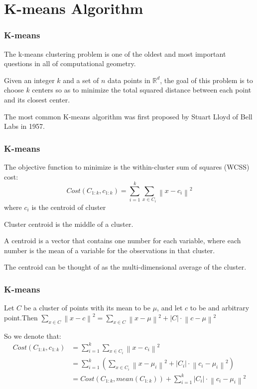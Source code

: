 \documentclass[9pt]{beamer}
\newcommand{\ccp}[1]{{\color{purple}#1}}
\begin{document}
\section{K-means Algorithm}
\begin{frame}
	\frametitle{K-means}
	The \ccp{k-means clustering} problem is one of the oldest and most important questions in all of computational geometry.
	\par Given an integer $k$ and a set of $n$ data points in $\mathbb{R}^{d}$, the goal of this problem is to choose \ccp{$k$ centers} so as to \ccp{minimize the total squared distance between each point and its closest center}.
	\par The most common K-means algorithm was first proposed by \ccp{Stuart Lloyd} of Bell Labs in 1957.

\end{frame}
\begin{frame}
	\frametitle{K-means}
	The objective function to minimize is the \ccp{within-cluster sum of squares} (WCSS) cost:
	$$Cost(C_{1:k}, c_{1:k}) = \sum_{i=1}^{k} \sum_{x \in C_i } {\left\lVert x - c _i \right\rVert }^2  $$
	where $c_i$ is the \ccp{centroid} of cluster
	\begin{definition}
		\ccp{Cluster centroid} is the \ccp{middle} of a cluster.
		\par A centroid is a vector that contains one number for each variable, where each number is the mean of a variable for the observations in that cluster.
		\par The centroid can be thought of as the multi-dimensional average of the cluster.
	\end{definition}
\end{frame}
\begin{frame}
	\frametitle{K-means}
	\begin{lemma}
		Let $C$ be a cluster of points with its mean to be $\mu$, and let $c$ to be and arbitrary point.Then $\sum_{x \in C}{\left\lVert x - c\right\rVert}^2 = \sum_{x \in C}{\left\lVert x - \mu\right\rVert}^2 + \left\lvert C \right\rvert \cdot {\left\lVert c - \mu\right\rVert}^2 $
	\end{lemma}
	So we denote that:
	\begin{equation*}
		\begin{split}
			Cost(C_{1:k}, c_{1:k}) & = \sum_{i=1}^{k} \sum_{x \in C_i } {\left\lVert x - c _i \right\rVert }^2 \\
			& = \sum_{i=1}^{k} (\sum_{x \in C_i} {\left\lVert x - \mu_i\right\rVert}^2 + \left\lvert C_i \right\rvert \cdot {\left\lVert c_i - \mu_i\right\rVert}^2) \\
			& = Cost(C_{1:k}, mean(C_{1:k})) + \sum_{i=1}^{k} {\left\lvert C_i\right\rvert }\cdot {\left\lVert c_i - \mu_i\right\rVert }^2
		\end{split}
	\end{equation*}
\end{frame}
\end{document}

